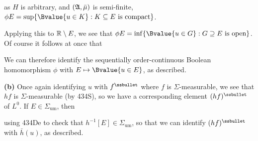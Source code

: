 {\noindent as $H$ is arbitrary, and $(\frak A,\bar\mu)$ is semi-finite,
$\phi E=\sup\{\Bvalue{u\in K}:K\subseteq E\text{ is compact}\}$.
\QeD

Applying this to $\Bbb R\setminus E$, we see that
$\phi E=\inf\{\Bvalue{u\in G}:G\supseteq E\text{ is open}\}$.
Of course it follows at once that


\noindent We can therefore identify the sequentially
order-continuous Boolean homomorphism $\phi$ with
$E\mapsto\Bvalue{u\in E}$, as described.

\medskip

{\bf (b)} Once again identifying $u$ with $f^{\ssbullet}$ where
$f$ is $\Sigma$-measurable, we see that $hf$ is $\Sigma$-measurable (by
434S), so we have a corresponding element $(hf)^{\ssbullet}$ of $L^0$.
If $E\in\Sigma_{\text{um}}$, then


\noindent using 434De to check that $h^{-1}[E]\in\Sigma_{\text{um}}$, so
that we can identify $(hf)^{\ssbullet}$ with $\bar h(u)$, as described.
}%

